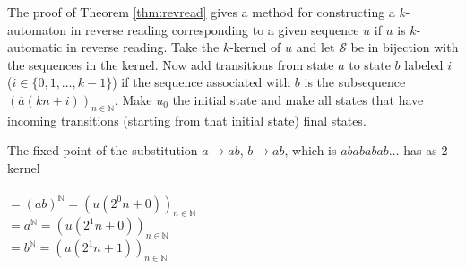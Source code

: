 \documentclass{article}
\begin{document}
The proof of Theorem \ref{thm:revread} gives a method for constructing a 
$k$-automaton in reverse reading corresponding to a given sequence $u$ if $u$ 
is $k$-automatic in reverse reading. Take the $k$-kernel of $u$ and let 
$\mathcal{S}$ be in bijection with the sequences in the kernel. Now add 
transitions from state $a$ to state $b$ labeled $i$ 
($i \in \{0, 1, \ldots, k - 1\}$) if the sequence associated with $b$ is the 
subsequence $(\overline{a}(kn + i))_{n \in \mathbb{N}}$. Make $u_0$ the initial
state and make all states that have incoming transitions (starting from that 
initial state) final states.

\begin{example} \label{ex:revread}
The fixed point of the substitution $a \to ab$, $b \to ab$,
which is $abababab\ldots$ has as 2-kernel\\
\\
$= (ab)^\mathbb{N} = (u(2^0 n + 0))_{n \in \mathbb{N}}$\\
$= a^\mathbb{N} = (u(2^1 n + 0))_{n \in \mathbb{N}}$\\
$= b^\mathbb{N} = (u(2^1 n + 1))_{n \in \mathbb{N}}$\\
\end{example}
\end{document}
